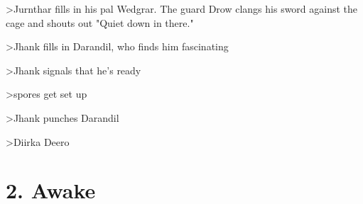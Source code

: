 \documentclass[letterpaper,10pt,twoside,twocolumn,openany]{book}
\begin{document}
>Jurnthar fills in his pal Wedgrar. The guard Drow clangs his sword against the cage and shouts out "Quiet down in there."

>Jhank fills in Darandil, who finds him fascinating

>Jhank signals that he's ready

>spores get set up

>Jhank punches Darandil

>Diirka Deero

\chapter{2. Awake}




\end{document}
